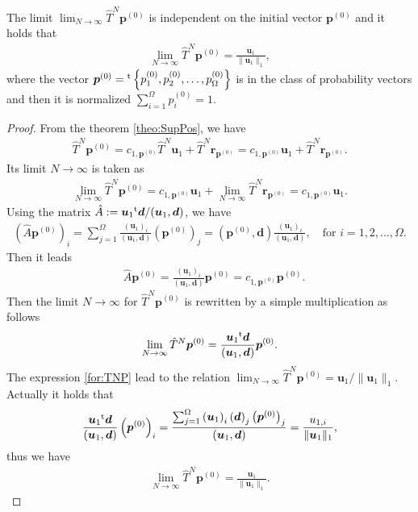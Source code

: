 \begin{theorem}
	The limit $\lim_{N\to\infty}\hat{T}^{N}\bm{p}^{(0)}$ is independent on the initial vector $\bm{p}^{(0)}$ and it holds that
	\begin{align}
	\lim_{N\to\infty}\hat{T}^{N}\bm{p}^{(0)} = \frac{\bm{u}_{1}}{\|\bm{u}_{1}\|_{1}},
	\end{align}
	where the vector $\bm{p}^{(0)}={}^{\rm t}\left\{p^{(0)}_{1}, p^{(0)}_{2}, \dots, p^{(0)}_{\Omega}\right\}$ is in the class of probability vectors and then it is normalized $\sum_{i=1}^{\Omega}p^{(0)}_{i} = 1$.
\end{theorem}

\begin{proof}
	From the theorem \ref{theo:SupPos}, we have
	\begin{align}
	\hat{T}^{N}\bm{p}^{(0)} = c_{1,\bm{p}^{(0)}}\hat{T}^{N}\bm{u}_{1} + \hat{T}^{N}\bm{r}_{\bm{p}^{(0)}} = c_{1,\bm{p}^{(0)}}\bm{u}_{1} + \hat{T}^{N}\bm{r}_{\bm{p}^{(0)}}.
	\end{align}
	Its limit $N\to\infty$ is taken as
	\begin{align}
	\lim_{N\to\infty}\hat{T}^{N}\bm{p}^{(0)} = c_{1,\bm{p}^{(0)}}\bm{u}_{1} + \lim_{N\to\infty}\hat{T}^{N}\bm{r}_{\bm{p}^{(0)}} = c_{1,\bm{p}^{(0)}}\bm{u}_{1}.
	\end{align}
	Using the matrix $\hat{A}:=\bm{u}_{1}{}^{\rm t}\bm{d}/(\bm{u}_{1},\bm{d})$, we have
	\begin{align}
	\left(\hat{A}\bm{p}^{(0)}\right)_{i} = \sum_{j = 1}^{\Omega}\frac{\left(\bm{u}_{1}\right)_{i}}{(\bm{u}_{1},\bm{d})}\left(\bm{p}^{(0)}\right)_{j} = \left(\bm{p}^{(0)},\bm{d}\right)\frac{\left(\bm{u}_{1}\right)_{i}}{(\bm{u}_{1},\bm{d})},\quad\text{for $i=1,2,\dots,\Omega$}.
	\end{align}
	Then it leads
	\begin{align}
	& \hat{A}\bm{p}^{(0)} = \frac{\left(\bm{u}_{1}\right)_{i}}{(\bm{u}_{1},\bm{d})}\bm{p}^{(0)} = c_{1,\bm{p}^{(0)}}\bm{p}^{(0)}.
	\end{align}
	Then the limit $N\to\infty$ for $\hat{T}^{N}\bm{p}^{(0)}$ is rewritten by a simple multiplication as follows
	\begin{align}
	\lim_{N\to\infty}\hat{T}^{N}\bm{p}^{(0)} = \frac{\bm{u}_{1}{}^{\rm t}\bm{d}}{(\bm{u}_{1},\bm{d})}\bm{p}^{(0)}.\label{for:TNP}
	\end{align}
	The expression \eqref{for:TNP} lead to the relation $\lim_{N\to\infty}\hat{T}^{N}\bm{p}^{(0)} = \bm{u}_{1}/\|\bm{u}_{1}\|_{1}$. Actually it holds that
	\begin{align}
	\frac{\bm{u}_{1}{}^{\rm t}\bm{d}}{(\bm{u}_{1},\bm{d})}\left(\bm{p}^{(0)}\right)_{i} = \frac{\sum_{j=1}^{\Omega}\left(\bm{u}_{1}\right)_{i}\left(\bm{d}\right)_{j}\left(\bm{p}^{(0)}\right)_{j}}{(\bm{u}_{1},\bm{d})} = \frac{u_{1,i}}{\|\bm{u}_{1}\|_{1}},
	\end{align}
	thus we have
	\begin{align}
	\lim_{N\to\infty}\hat{T}^{N}\bm{p}^{(0)} = \frac{\bm{u}_{1}}{\|\bm{u}_{1}\|_{1}}.
	\end{align}
\end{proof}

